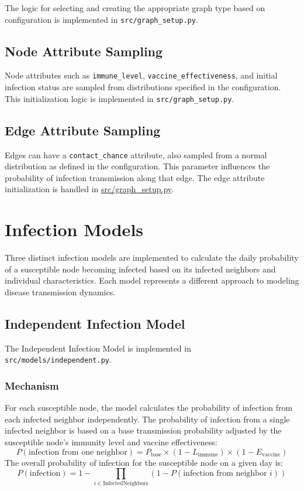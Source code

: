 \documentclass[12pt]{article}
\begin{document}
The logic for selecting and creating the appropriate graph type based on configuration is implemented in \texttt{src/graph\_setup.py}.

\subsection{Node Attribute Sampling}
Node attributes such as \texttt{immune\_level}, \texttt{vaccine\_ef\-fec\-tive\-ness}, and initial infection status are sampled from distributions specified in the configuration. This initialization logic is implemented in \texttt{src/graph\_setup.py}.

\subsection{Edge Attribute Sampling}
Edges can have a \texttt{contact\_chance} attribute, also sampled from a normal distribution as defined in the configuration. This parameter influences the probability of infection transmission along that edge. The edge attribute initialization is handled in \url{src/graph_setup.py}.

\section{Infection Models}
Three distinct infection models are implemented to calculate the daily probability of a susceptible node becoming infected based on its infected neighbors and individual characteristics. Each model represents a different approach to modeling disease transmission dynamics.

\subsection{Independent Infection Model}
The Independent Infection Model is implemented in \texttt{src/models/independent.py}.
\subsubsection{Mechanism}
For each susceptible node, the model calculates the probability of infection from each infected neighbor independently. The probability of infection from a single infected neighbor is based on a base transmission probability adjusted by the susceptible node's immunity level and vaccine effectiveness:
\[ P(\text{infection from one neighbor}) = P_{\text{base}} \times (1 - L_{\text{immune}}) \times (1 - E_{\text{vaccine}}) \]
The overall probability of infection for the susceptible node on a given day is:
\[ P(\text{infection}) = 1 - \prod_{i \in \text{InfectedNeighbors}} (1 - P(\text{infection from neighbor } i)) \]
\end{document}
